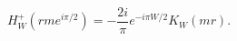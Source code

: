 \begin{equation}
\label{Eq_0222}
H^{+}_W(rme^{i\pi/2}) = - \frac{2i}{\pi} e^{-i\pi W/2} K_W(mr).
\end{equation}

